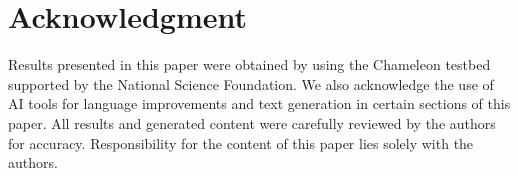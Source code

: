 \section*{Acknowledgment}\label{sec:acknowledgment}
Results presented in this paper were obtained by using the Chameleon testbed supported by the National Science Foundation.
We also acknowledge the use of AI tools for language improvements and text generation in certain sections of this paper. All results and generated content were carefully reviewed by the authors for accuracy. Responsibility for the content of this paper lies solely with the authors.
